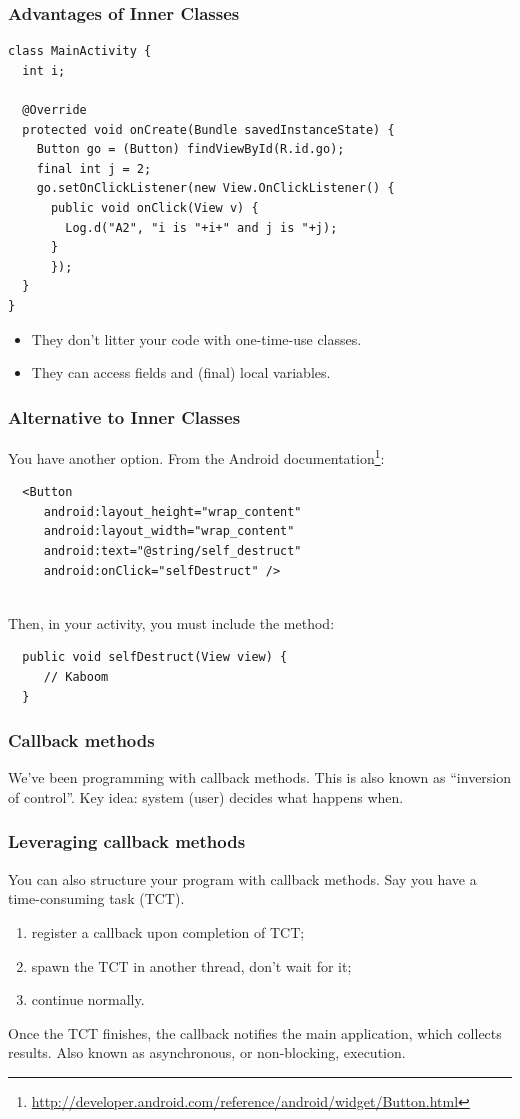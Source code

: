 \documentclass[aspectratio=169]{beamer}
\begin{document}
\begin{frame}[fragile]
\frametitle{Advantages of Inner Classes}

{\small
\begin{verbatim}
class MainActivity {
  int i;

  @Override
  protected void onCreate(Bundle savedInstanceState) {
    Button go = (Button) findViewById(R.id.go);
    final int j = 2;
    go.setOnClickListener(new View.OnClickListener() {
      public void onClick(View v) {
        Log.d("A2", "i is "+i+" and j is "+j);
      }
      }); 
  }
}
\end{verbatim}
}

\begin{itemize}
\item They don't litter your code with one-time-use classes.
\item They can access fields and (final) local variables.
\end{itemize}

\end{frame}

\begin{frame}[fragile]
\frametitle{Alternative to Inner Classes}

You have another option. From the Android documentation\footnote{\tiny \url{http://developer.android.com/reference/android/widget/Button.html}}:
\begin{verbatim}
  <Button
     android:layout_height="wrap_content"
     android:layout_width="wrap_content"
     android:text="@string/self_destruct"
     android:onClick="selfDestruct" />
\end{verbatim}
~\\[1em]

Then, in your activity, you must include the method:
\begin{verbatim}
  public void selfDestruct(View view) {
     // Kaboom
  }
\end{verbatim}

\end{frame}

\begin{frame}
\frametitle{Callback methods}
We've been programming with \alert{callback methods}.\vfill
This is also known as ``inversion of control''.\vfill
Key idea: system (user) decides what happens when.
\end{frame}

\begin{frame}
\frametitle{Leveraging callback methods}
You can also structure your program with callback methods.
Say you have a time-consuming task (TCT).\vfill
\begin{enumerate}
\item register a callback upon completion of TCT;
\item spawn the TCT in another thread, don't wait for it;
\item continue normally.
\end{enumerate}\vfill
Once the TCT finishes, the callback notifies the main application,
which collects results.\vfill
Also known as asynchronous, or non-blocking, execution.
\end{frame}
\end{document}
